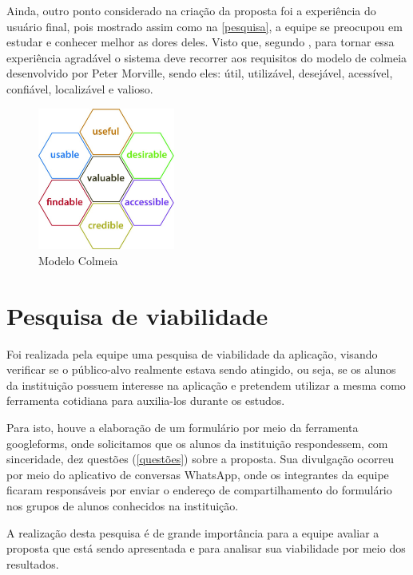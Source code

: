 Ainda, outro ponto considerado na criação da proposta foi a experiência do usuário final, pois mostrado assim como na \autoref{pesquisa}, a equipe se preocupou em estudar e conhecer melhor as dores deles. Visto que, segundo , para tornar essa experiência agradável o sistema deve recorrer aos requisitos do modelo de colmeia desenvolvido por Peter Morville, sendo eles: útil, utilizável, desejável, acessível, confiável, localizável e valioso.

\begin{figure}[htb]
\centering
\caption{Modelo Colmeia}
\includegraphics[width=0.4\textwidth]{anexos/modelo_colmeia.jpg}
\end{figure}
\FloatBarrier


\section{Pesquisa de viabilidade} \label{pesquisa}
Foi realizada pela equipe uma pesquisa de viabilidade da aplicação, visando verificar se o público-alvo realmente estava sendo atingido, ou seja, se os alunos da instituição possuem interesse na aplicação e pretendem utilizar a mesma como ferramenta cotidiana para auxilia-los durante os estudos.

Para isto, houve a elaboração de um formulário por meio da ferramenta \gls{googleforms}, onde solicitamos que os alunos da instituição respondessem, com sinceridade, dez questões (\autoref{questões}) sobre a proposta. Sua divulgação ocorreu por meio do aplicativo de conversas \gls{WhatsApp}, onde os integrantes da equipe ficaram responsáveis por enviar o endereço de compartilhamento do formulário nos grupos de alunos conhecidos na instituição.

A realização desta pesquisa é de grande importância para a equipe avaliar a proposta que está sendo apresentada e para analisar sua viabilidade por meio dos resultados.
